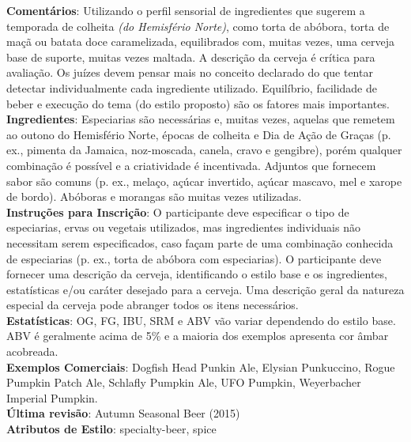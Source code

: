 \textbf{Comentários}: Utilizando o perfil sensorial de ingredientes que sugerem a temporada de colheita \textit{(do Hemisfério Norte)}, como torta de abóbora, torta de maçã ou batata doce caramelizada, equilibrados com, muitas vezes, uma cerveja base de suporte, muitas vezes maltada. A descrição da cerveja é crítica para avaliação. Os juízes devem pensar mais no conceito declarado do que tentar detectar individualmente cada ingrediente utilizado. Equilíbrio, facilidade de beber e execução do tema (do estilo proposto) são os fatores mais importantes. \\
\textbf{Ingredientes}: Especiarias são necessárias e, muitas vezes, aquelas que remetem ao outono do Hemisfério Norte, épocas de colheita e Dia de Ação de Graças (p. ex., pimenta da Jamaica, noz-moscada, canela, cravo e gengibre), porém qualquer combinação é possível e a criatividade é incentivada. Adjuntos que fornecem sabor são comuns (p. ex., melaço, açúcar invertido, açúcar mascavo, mel e xarope de bordo). Abóboras e morangas são muitas vezes utilizadas. \\
\textbf{Instruções para Inscrição}: O participante deve especificar o tipo de especiarias, ervas ou vegetais utilizados, mas ingredientes individuais não necessitam serem especificados, caso façam parte de uma combinação conhecida de especiarias (p. ex., torta de abóbora com especiarias). O participante deve fornecer uma descrição da cerveja, identificando o estilo base e os ingredientes, estatísticas e/ou caráter desejado para a cerveja. Uma descrição geral da natureza especial da cerveja pode abranger todos os itens necessários. \\
\textbf{Estatísticas}: OG, FG, IBU, SRM e ABV vão variar dependendo do estilo base. ABV é geralmente acima de 5\% e a maioria dos exemplos apresenta cor âmbar acobreada. \\
\textbf{Exemplos Comerciais}: Dogfish Head Punkin Ale, Elysian Punkuccino, Rogue Pumpkin Patch Ale, Schlafly Pumpkin Ale, UFO Pumpkin, Weyerbacher Imperial Pumpkin. \\
\textbf{Última revisão}: Autumn Seasonal Beer (2015) \\
\textbf{Atributos de Estilo}: specialty-beer, spice

